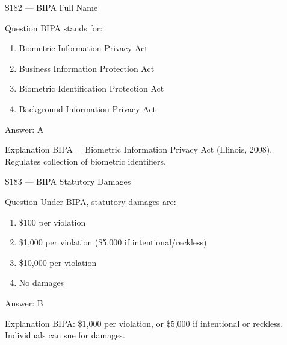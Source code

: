 \documentclass[aspectratio=169,8pt]{beamer}
\begin{document}
\begin{frame}{S182 --- BIPA Full Name}
	\begin{block}{Question}
		BIPA stands for:
		\begin{enumerate}
			\item Biometric Information Privacy Act
			\item Business Information Protection Act
			\item Biometric Identification Protection Act
			\item Background Information Privacy Act
		\end{enumerate}
	\end{block}
	\begin{exampleblock}{Answer: A}\end{exampleblock}
	\begin{block}{Explanation}
		BIPA = Biometric Information Privacy Act (Illinois, 2008). Regulates collection of biometric identifiers.
	\end{block}
\end{frame}

\begin{frame}{S183 --- BIPA Statutory Damages}
	\begin{block}{Question}
		Under BIPA, statutory damages are:
		\begin{enumerate}
			\item \$100 per violation
			\item \$1,000 per violation (\$5,000 if intentional/reckless)
			\item \$10,000 per violation
			\item No damages
		\end{enumerate}
	\end{block}
	\begin{exampleblock}{Answer: B}\end{exampleblock}
	\begin{block}{Explanation}
		BIPA: \$1,000 per violation, or \$5,000 if intentional or reckless. Individuals can sue for damages.
	\end{block}
\end{frame}
\end{document}
